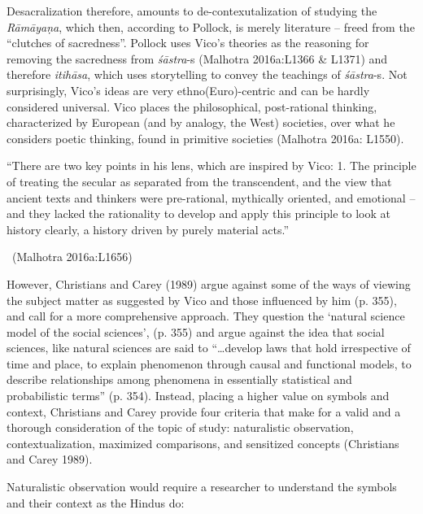 Desacralization therefore, amounts to de-contexutalization of studying the \textit{Rāmāyaṇa}, which then, according to Pollock, is merely literature – freed from the “clutches of sacredness”. Pollock uses Vico’s theories as the reasoning for removing the sacredness from \textit{śāstra}-s (Malhotra 2016a:L1366 \& L1371) and therefore \textit{itihāsa}, which uses storytelling to convey the teachings of \textit{śāstra}-s. Not surprisingly, Vico’s ideas are very ethno(Euro)-centric and can be hardly considered universal. Vico places the philosophical, post-rational thinking, characterized by European (and by analogy, the West) societies, over what he considers poetic thinking, found in primitive societies (Malhotra 2016a: L1550).

\begin{myquote}
“There are two key points in his lens, which are inspired by Vico: 1. The principle of treating the secular as separated from the transcendent, and the view that ancient texts and thinkers were pre-rational, mythically oriented, and emotional – and they lacked the rationality to develop and apply this principle to look at history clearly, a history driven by purely material acts.” 

\vskip -5pt

~\hfill (Malhotra 2016a:L1656)
\end{myquote}

However, Christians and Carey (1989) argue against some of the ways of viewing the subject matter as suggested by Vico and those influenced by him (p. 355), and call for a more comprehensive approach. They question the ‘natural science model of the social sciences’, (p. 355) and argue against the idea that social sciences, like natural sciences are said to “…develop laws that hold irrespective of time and place, to explain phenomenon through causal and functional models, to describe relationships among phenomena in essentially statistical and probabilistic terms” (p. 354). Instead, placing a higher value on symbols and context, Christians and Carey provide four criteria that make for a valid and a thorough consideration of the topic of study: naturalistic observation, contextualization, maximized comparisons, and sensitized concepts (Christians and Carey 1989).

Naturalistic observation would require a researcher to understand the symbols and their context as the Hindus do:


